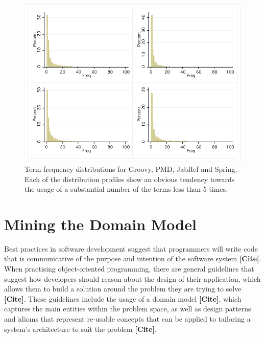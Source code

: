 \begin{figure}[t]
\centering
\includegraphics[width=\textwidth]{Figures/Vocab-FrequencyDistComparison.pdf}
\caption{Term frequency distributions for Groovy, PMD, JabRef and Spring. Each of the distribution profiles show an obvious tendency towards the usage of a substantial number of the terms less than 5 times.}
\label{fig:vocab-freq-dist-comparison}
\end{figure}



\section{Mining the Domain Model} %
\label{sec:mining_the_domain_model}

Best practices in software development suggest that programmers will write code that is communicative of the purpose and intention of the software system \textbf{[Cite]}. When practising object-oriented programming, there are general guidelines that suggest how developers should reason about the design of their application, which allows them to build a solution around the problem they are trying to solve \textbf{[Cite]}. These guidelines include the usage of a domain model \textbf{[Cite]}, which captures the main entities within the problem space, as well as design patterns and idioms that represent re-usable concepts that can be applied to tailoring a system's architecture to suit the problem \textbf{[Cite]}.

